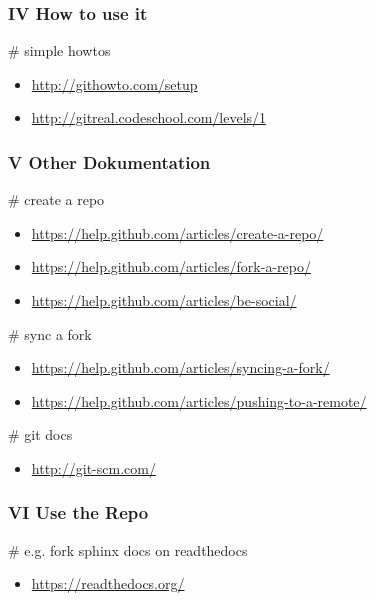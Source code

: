 \documentclass[letterpaper,10pt,english]{sphinxmanual}
\begin{document}
\subsubsection{IV How to use it}
\label{sdocs/github/github:iv-how-to-use-it}
\# simple howtos
\begin{itemize}
\item {} 
\href{http://githowto.com/setup}{http://githowto.com/setup}

\item {} 
\href{http://gitreal.codeschool.com/levels/1}{http://gitreal.codeschool.com/levels/1}

\end{itemize}


\subsubsection{V Other Dokumentation}
\label{sdocs/github/github:v-other-dokumentation}
\# create a repo
\begin{itemize}
\item {} 
\href{https://help.github.com/articles/create-a-repo/}{https://help.github.com/articles/create-a-repo/}

\item {} 
\href{https://help.github.com/articles/fork-a-repo/}{https://help.github.com/articles/fork-a-repo/}

\item {} 
\href{https://help.github.com/articles/be-social/}{https://help.github.com/articles/be-social/}

\end{itemize}

\# sync a fork
\begin{itemize}
\item {} 
\href{https://help.github.com/articles/syncing-a-fork/}{https://help.github.com/articles/syncing-a-fork/}

\item {} 
\href{https://help.github.com/articles/pushing-to-a-remote/}{https://help.github.com/articles/pushing-to-a-remote/}

\end{itemize}

\# git docs
\begin{itemize}
\item {} 
\href{http://git-scm.com/}{http://git-scm.com/}

\end{itemize}


\subsubsection{VI Use the Repo}
\label{sdocs/github/github:vi-use-the-repo}
\# e.g. fork sphinx docs on readthedocs
\begin{itemize}
\item {} 
\href{https://readthedocs.org/}{https://readthedocs.org/}

\end{itemize}
\end{document}
